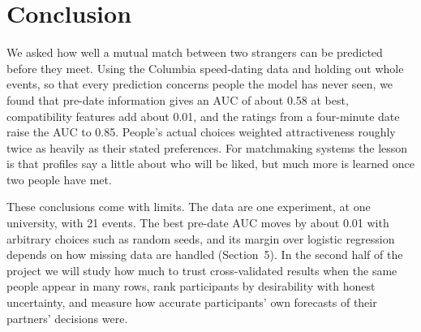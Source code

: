 \section{Conclusion}

We asked how well a mutual match between two strangers can be predicted before they meet. Using the Columbia
speed-dating data and holding out whole events, so that every prediction concerns people the model has never seen,
we found that pre-date information gives an AUC of about 0.58 at best, compatibility features add about 0.01, and the
ratings from a four-minute date raise the AUC to 0.85. People's actual choices weighted attractiveness roughly twice as
heavily as their stated preferences. For matchmaking systems the lesson is that profiles say a little about who will
be liked, but much more is learned once two people have met.

These conclusions come with limits. The data are one experiment, at one university, with 21 events. The best
pre-date AUC moves by about 0.01 with arbitrary choices such as random seeds, and its margin over logistic regression depends
on how missing data are handled (Section~5). In the second half of the project we will study how much to trust
cross-validated results when the same people appear in many rows, rank participants by desirability with honest
uncertainty, and measure how accurate participants' own forecasts of their partners' decisions were.
